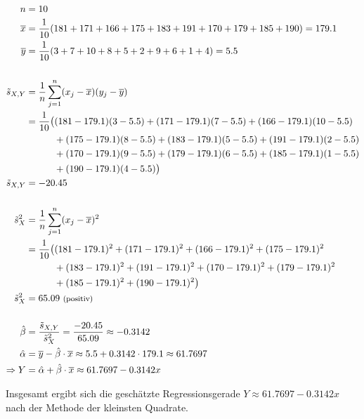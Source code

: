 \vspace{-0.5cm}
{\allowdisplaybreaks
    \begin{align*}
        n &= 10 \\*
        \overline{x} &= \frac{1}{10} (181 + 171 + 166 + 175 + 183 +191 + 170 + 179 + 185 + 190) = 179.1 \\*
        \overline{y} &= \frac{1}{10} (3 + 7 + 10 + 8 + 5 + 2 + 9 + 6 + 1 + 4) = 5.5 \\*
        \nonumber \\
        \tilde{s}_{X,Y} &= \frac1n \sum_{j=1}^{n} (x_j - \overline{x})(y_j - \overline{y}) \\*
        &= \frac{1}{10} \big( (181 - 179.1) (3 - 5.5) + (171 - 179.1) (7 - 5.5) + (166 - 179.1) (10 - 5.5) \\*
            &\qquad\quad + (175 - 179.1) (8 - 5.5)  + (183 - 179.1) (5 - 5.5) + (191 - 179.1) (2 - 5.5) \\*
            &\qquad\quad + (170 - 179.1) (9 - 5.5) + (179 - 179.1) (6 - 5.5) + (185 - 179.1) (1 - 5.5) \\*
            &\qquad\quad + (190 - 179.1) (4 - 5.5) \big) \\*
        \tilde{s}_{X,Y} &= -20.45 \\
        \nonumber \\
        \tilde{s}_X^2 &= \frac1n \sum_{j=1}^{n} (x_j - \overline{x})^2 \\*
        &= \frac{1}{10} \big( (181 - 179.1)^2 + (171 - 179.1)^2 + (166 - 179.1)^2 + (175 - 179.1)^2 \\*
            &\qquad\quad + (183 - 179.1)^2 + (191 - 179.1)^2 + (170 - 179.1)^2 + (179 - 179.1)^2 \\*
            &\qquad\quad + (185 - 179.1)^2 + (190 - 179.1)^2 \big) \\*
        \tilde{s}_X^2 &= 65.09 ~{\text{\footnotesize(positiv)}} \\
        \nonumber \\
        \hat\beta &= \frac{\tilde{s}_{X,Y}}{\tilde{s}_X^2}
            = \frac{-20.45}{65.09} \approx -0.3142 \\*
        \hat\alpha &= \overline{y} - \hat\beta\cdot\overline{x} \approx 5.5 + 0.3142 \cdot 179.1 \approx 61.7697 \\*
        \Rightarrow Y &= \hat\alpha + \hat\beta \cdot \overline{x} \approx 61.7697 - 0.3142x
    \end{align*}
}

Insgesamt ergibt sich die geschätzte Regressionsgerade $Y \approx 61.7697 - 0.3142x$ nach der Methode der kleinsten Quadrate.


